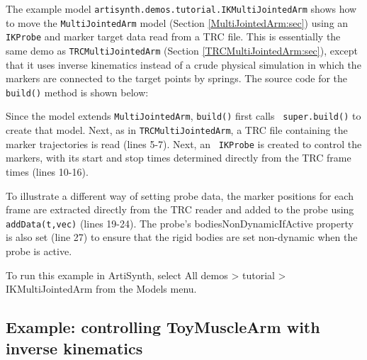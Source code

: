 The example model {\tt artisynth.demos.tutorial.IKMultiJointedArm} shows how to
move the {\tt MultiJointedArm} model (Section \ref{MultiJointedArm:sec}) using
an {\tt IKProbe} and marker target data read from a TRC file. This is
essentially the same demo as {\tt TRCMultiJointedArm} (Section
\ref{TRCMultiJointedArm:sec}), except that it uses inverse kinematics instead
of a crude physical simulation in which the markers are connected to the target
points by springs. The source code for the {\tt build()} method is shown below:
%
\lstset{numbers=left}
\iflatexml

\else

\fi
\lstset{numbers=none}
%
Since the model extends {\tt MultiJointedArm}, {\tt build()} first calls {\tt
super.build()} to create that model. Next, as in {\tt TRCMultiJointedArm}, a
TRC file containing the marker trajectories is read (lines 5-7).  Next, an {\tt
IKProbe} is created to control the markers, with its start and stop times
determined directly from the TRC frame times (lines 10-16).

To illustrate a different way of setting probe data, the marker positions for
each frame are extracted directly from the TRC reader and added to the probe
using {\tt addData(t,vec)} (lines 19-24).  The probe's {\sf
bodiesNonDynamicIfActive} property is also set (line 27) to ensure that the
rigid bodies are set non-dynamic when the probe is active.

To run this example in ArtiSynth, select {\sf All demos > tutorial >
IKMultiJointedArm} from the {\sf Models} menu.

\subsection{Example: controlling ToyMuscleArm with inverse kinematics}


